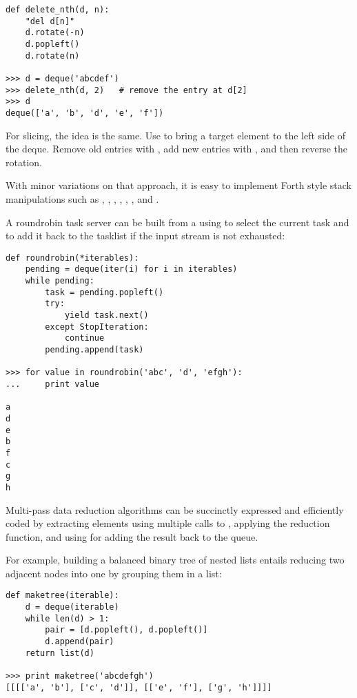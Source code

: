 \begin{verbatim}
def delete_nth(d, n):
    "del d[n]"
    d.rotate(-n)
    d.popleft()
    d.rotate(n)

>>> d = deque('abcdef')
>>> delete_nth(d, 2)   # remove the entry at d[2]
>>> d
deque(['a', 'b', 'd', 'e', 'f'])

\end{verbatim}

For slicing, the idea is the same.  Use  to bring a target
element to the left side of the deque.  Remove old entries with
, add new entries with , and then
reverse the rotation.

With minor variations on that approach, it is easy to implement Forth style
stack manipulations such as , , , ,
, , and .

A roundrobin task server can be built from a  using
 to select the current task and 
to add it back to the tasklist if the input stream is not exhausted:

\begin{verbatim}
def roundrobin(*iterables):
    pending = deque(iter(i) for i in iterables)
    while pending:
        task = pending.popleft()
        try:
            yield task.next()
        except StopIteration:
            continue
        pending.append(task)

>>> for value in roundrobin('abc', 'd', 'efgh'):
...     print value

a
d
e
b
f
c
g
h

\end{verbatim}


Multi-pass data reduction algorithms can be succinctly expressed and
efficiently coded by extracting elements using multiple calls to
, applying the reduction function, and using
 for adding the result back to the queue.

For example, building a balanced binary tree of nested lists entails
reducing two adjacent nodes into one by grouping them in a list:

\begin{verbatim}
def maketree(iterable):
    d = deque(iterable)
    while len(d) > 1:
        pair = [d.popleft(), d.popleft()]
        d.append(pair)
    return list(d)

>>> print maketree('abcdefgh')
[[[['a', 'b'], ['c', 'd']], [['e', 'f'], ['g', 'h']]]]

\end{verbatim}
